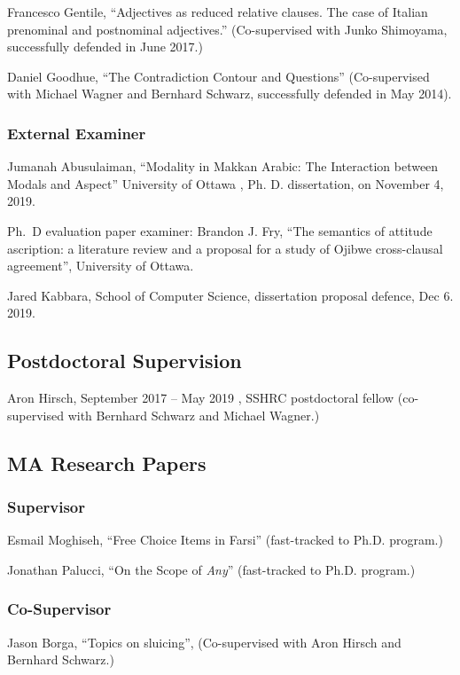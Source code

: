 \documentclass[11pt]{article}
\begin{document}
Francesco Gentile,  ``Adjectives as reduced relative clauses. The case of Italian prenominal and postnominal adjectives.'' (Co-supervised with Junko Shimoyama, successfully defended in June 2017.)

Daniel Goodhue, ``The Contradiction Contour and Questions''
(Co-supervised with Michael Wagner and Bernhard Schwarz, successfully
defended in May 2014).

\subsubsection*{External Examiner}

Jumanah Abusulaiman, “Modality in Makkan Arabic: The Interaction between Modals and Aspect” University of Ottawa , Ph. D. dissertation, on November 4, 2019.

Ph.\ D evaluation paper examiner: Brandon J. Fry, ``The semantics of attitude ascription: a literature review and a proposal for a study of Ojibwe cross-clausal agreement'', University of Ottawa.

Jared Kabbara, School of Computer Science, dissertation proposal defence, Dec 6. 2019.


\subsection*{Postdoctoral Supervision}

Aron Hirsch, September 2017 -- May 2019 , SSHRC postdoctoral fellow (co-supervised with Bernhard Schwarz and Michael Wagner.)

\subsection*{MA Research Papers}

\subsubsection*{Supervisor}

Esmail Moghiseh, ``Free Choice Items in Farsi'' (fast-tracked to Ph.D. program.)

Jonathan Palucci, ``On the Scope of \textit{Any}'' (fast-tracked to Ph.D. program.)

\subsubsection*{Co-Supervisor}

Jason Borga, ``Topics on sluicing'', (Co-supervised with Aron Hirsch and Bernhard Schwarz.)
\end{document}
